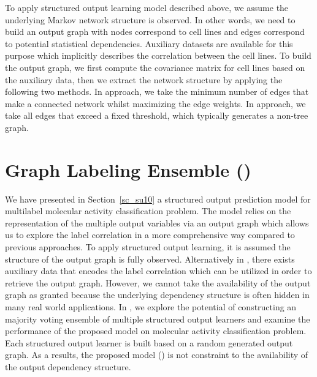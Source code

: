 {%
To apply structured output learning model described above, we assume the underlying Markov network structure is observed.
In other words, we need to build an output graph with nodes correspond to cell lines and edges correspond to potential statistical dependencies.
Auxiliary datasets are available for this purpose \citep{Shoemaker06the} which implicitly describes the correlation between the cell lines.
To build the output graph, we first compute the covariance matrix for cell lines based on the auxiliary data, then we extract the network structure by applying the following two methods.
In  approach, we take the minimum number of edges that make a connected network whilst maximizing the edge weights.
In  approach, we take all edges that exceed a fixed threshold, which typically generates a non-tree graph.



%
%
\section{Graph Labeling Ensemble (\mve)}\label{sc_su11}

We have presented in Section~\ref{sc_su10} a structured output prediction model for multilabel molecular activity classification problem.
The model relies on the representation of the multiple output variables via an output graph which allows us to explore the label correlation in a more comprehensive way compared to previous approaches.
To apply structured output learning, it is assumed the structure of the output graph is fully observed.
Alternatively in , there exists auxiliary data that encodes the label correlation which can be utilized in order to retrieve the output graph.
However, we cannot take the availability of the output graph as granted because the underlying dependency structure is often hidden in many real world applications.
In , we explore the potential of constructing an majority voting ensemble of multiple structured output learners and examine the performance of the proposed model on molecular activity classification problem.
Each structured output learner is built based on a random generated output graph.
As a results, the proposed model (\mve) is not constraint to the availability of the output dependency structure.



}
